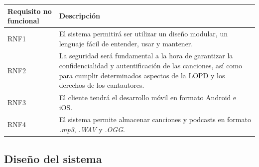 \documentclass{article}
\begin{document}
\begin{table}[H]
	\begin{tabular}{p{4cm} p{10cm}}
		\hline
		\hline 
		\textbf{Requisito no funcional} & \textbf{Descripción} \\ 
		\hline
		\hline
		RNF1 
		&  El sistema permitirá ser utilizar un diseño modular, un lenguaje fácil de entender, usar y mantener.\\ 
		\hline
		RNF2
		&  La seguridad será fundamental a la hora de garantizar la confidencialidad y autentificación de las canciones, así como para cumplir determinados aspectos de la LOPD y los derechos de los cantautores.\\ 
		\hline
		RNF3
		&  El cliente tendrá el desarrollo móvil en formato Android e iOS.\\ 
		\hline
		RNF4
		& El sistema permite almacenar canciones y podcasts en formato \textit{.mp3}, \textit{.WAV} y \textit{.OGG}. \\
	\end{tabular}
\end{table}
\newpage

\subsection{Diseño del sistema}
\end{document}
